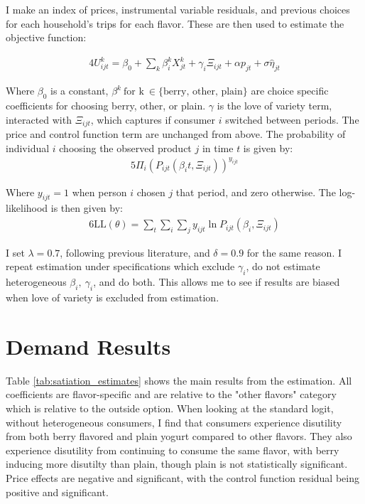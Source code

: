\documentclass[11pt]{article}
\theoremstyle{definition}
\theoremstyle{remark}
\begin{document}
I make an index of prices, instrumental variable residuals, and previous choices for each household's trips for each flavor. These are then used to estimate the objective function:

\begin{alignat*}{4}
  U^k_{ijt} = \beta_0 +  \sum_k\beta_i^kX^k_{jt} + \gamma_i\Xi_{ijt} + \alpha p_{jt} + \sigma\hat{\eta}_{jt}
\end{alignat*}

Where $\beta_0$ is a constant, $\beta^k \ \text{for k} \ \in \{\text{berry, other, plain}\}$ are choice specific coefficients for choosing berry, other, or plain. $\gamma$ is the love of variety term, interacted with $\Xi_{ijt}$, which captures if consumer $i$ switched between periods. The price and control function term are unchanged from above. The probability of individual $i$ choosing the observed product $j$ in time $t$ is given by:
\begin{alignat*}{5}
  \Pi_i(P_{ijt}(\beta_it, \Xi_{ijt}))^{y_{ijt}}
\end{alignat*}

Where $y_{ijt} = 1$ when person $i$ chosen $j$ that period, and zero otherwise. The log-likelihood is then given by:
\begin{alignat*}{6}
  \text{LL}(\theta) = \sum_t\sum_i\sum_jy_{ijt}\ln P_{ijt}(\beta_i, \Xi_{ijt})
\end{alignat*}

I set $\lambda=0.7$, following previous literature, and $\delta=0.9$ for the same reason. I repeat estimation under specifications which exclude $\gamma_i$, do not estimate heterogeneous $\beta_i, \ \gamma_i$, and do both. This allows me to see if results are biased when love of variety is excluded from estimation. 

\section{Demand Results}

Table \ref{tab:satiation_estimates} shows the main results from the estimation. All coefficients are flavor-specific and are relative to the "other flavors" category which is relative to the outside option. When looking at the standard logit, without heterogeneous consumers, I find that consumers experience disutility from both berry flavored and plain yogurt compared to other flavors. They also experience disutility from continuing to consume the same flavor, with berry inducing more disutilty than plain, though plain is not statistically significant. Price effects are negative and significant, with the control function residual being positive and significant. 
\end{document}
